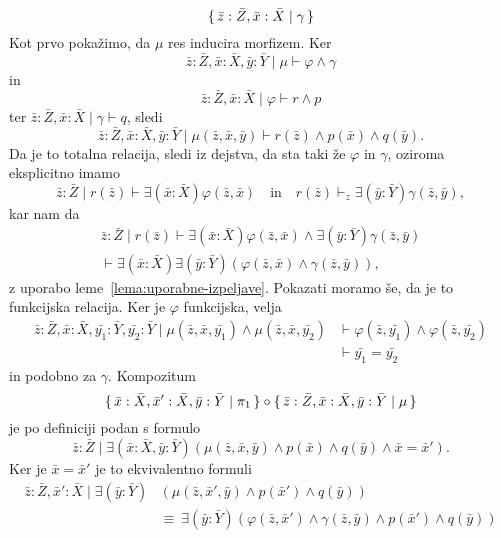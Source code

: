 \documentclass[../kategoricna_logika.tex]{subfiles}
\begin{document}
\begin{dokaz}
\begin{enumerate}[label=(\roman*)]
$$    \lbrace\,\bar{z}:\bar{Z},\bar{x}:\bar{X} \mid \gamma\,\rbrace$$
    Kot prvo pokažimo,
    da $\mu$ res inducira morfizem.  Ker
    $$\bar{z}:\bar{Z},\bar{x}:\bar{X},\bar{y}:\bar{Y} \mid \mu \vdash \varphi \land \gamma$$
    in $$\bar{z}:\bar{Z},\bar{x}:\bar{X} \mid \varphi \vdash r \land p$$
    ter $\bar{z}:\bar{Z}, \bar{x}:\bar{X} \mid \gamma \vdash q$,
    sledi
    $$\bar{z}:\bar{Z},\bar{x}:\bar{X},\bar{y}:\bar{Y} \mid  \mu(\bar{z},\bar{x},\bar{y}) \vdash r(\bar{z}) \land p(\bar{x}) \land q(\bar{y}).$$
    Da je to
    totalna relacija, sledi iz dejstva, da sta taki že $\varphi$ in
    $\gamma$, oziroma eksplicitno imamo
    $$\bar{z}:\bar{Z} \mid  r(\bar{z}) \vdash \exists (\bar{x}:\bar{X}) \varphi(\bar{z},\bar{x}) \quad \text{in}\quad
    r(\bar{z}) \vdash_z \exists (\bar{y}:\bar{Y}) \gamma(\bar{z},\bar{y}),$$
    kar nam da
\begin{multline*}
    \bar{z}:\bar{Z} \mid r(\bar{z}) \vdash \exists (\bar{x}:\bar{X}) \varphi(\bar{z},\bar{x}) \land \exists (\bar{y}:\bar{Y})
    \gamma(\bar{z},\bar{y}) \\
    \vdash \exists (\bar{x}:\bar{X}) \exists (\bar{y}:\bar{Y}) (\varphi(\bar{z},\bar{x}) \land
      \gamma(\bar{z},\bar{y})),
      \end{multline*}
    z uporabo leme~\ref{lema:uporabne-izpeljave}.
    Pokazati moramo še, da je to funkcijska relacija.  Ker je
    $\varphi$ funkcijska, velja
\begin{align*}
    \bar{z}:\bar{Z},\bar{x}:\bar{X},\bar{y_1}:\bar{Y},\bar{y_2}:\bar{Y} \mid \mu(\bar{z},\bar{x},\bar{y_1}) \land \mu(\bar{z},\bar{x},\bar{y_2}) &\vdash
    \varphi(\bar{z},\bar{y_1}) \land \varphi(\bar{z},\bar{y_2}) \\
    &\vdash  \bar{y_1} = \bar{y_2}
      \end{align*}
    in podobno za $\gamma$.  Kompozitum
    $$\lbrace\,\bar{x}:\bar{X}, \bar{x}':\bar{X}, \bar{y}:\bar{Y} \mid \pi_1\,\rbrace \circ
    \lbrace\,\bar{z}:\bar{Z},\bar{x}:\bar{X},\bar{y}:\bar{Y} \mid \mu\,\rbrace$$
    je po definiciji podan s formulo
    \[\bar{z}:\bar{Z} \mid  \exists (\bar{x}:\bar{X},\bar{y}:\bar{Y})(\mu(\bar{z},\bar{x},\bar{y}) \land p(\bar{x}) \land q(\bar{y}) \land \bar{x}=\bar{x}').\] Ker
    je $\bar{x} = \bar{x}'$ je to ekvivalentno formuli
    \begin{align*}
      \bar{z}:\bar{Z},\bar{x}':\bar{X} \mid \exists (\bar{y}:\bar{Y}) &(\mu(\bar{z},\bar{x}',\bar{y}) \land p(\bar{x}') \land q(\bar{y})) \\
      &\equiv \ \exists (\bar{y}:\bar{Y})(\varphi(\bar{z},\bar{x}') \land \gamma(\bar{z},\bar{y}) \land p(\bar{x}') \land q(\bar{y})) \\

\end{align*}
\end{enumerate}
\end{dokaz}
\end{document}
